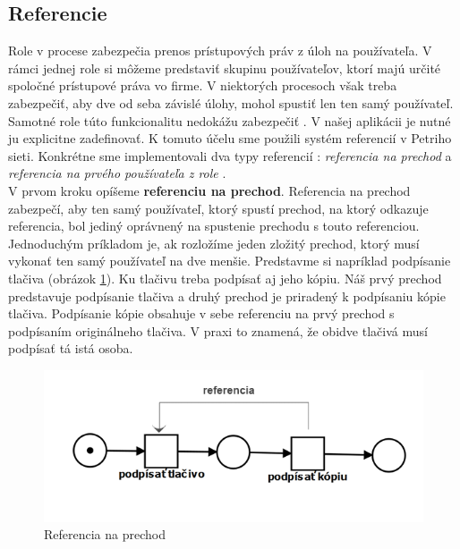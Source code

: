\subsection{Referencie}
Role v procese zabezpečia prenos prístupových práv z úloh na používateľa. V rámci jednej role si môžeme predstaviť skupinu používateľov, ktorí majú určité spoločné prístupové práva vo firme. V niektorých procesoch však treba zabezpečiť, aby dve od seba závislé úlohy, mohol spustiť len ten samý používateľ. Samotné role túto funkcionalitu nedokážu zabezpečiť . V našej aplikácii je nutné ju explicitne zadefinovať. K tomuto účelu sme použili systém referencií v Petriho sieti. Konkrétne sme implementovali dva typy referencií : \emph{referencia na prechod} a \emph{referencia na prvého používateľa z role} .\\ 

V prvom	 kroku opíšeme \textbf{referenciu na prechod}. Referencia na prechod zabezpečí, aby ten samý používateľ, ktorý spustí prechod, na ktorý odkazuje referencia, bol jediný oprávnený na spustenie prechodu s touto referenciou. Jednoduchým príkladom je, ak rozložíme jeden zložitý prechod, ktorý musí vykonať ten samý používateľ na dve menšie. Predstavme si napríklad podpísanie tlačiva (obrázok \ref{fig:referencia_na_prechod}). Ku tlačivu treba podpísať aj jeho kópiu. Náš prvý prechod predstavuje podpísanie tlačiva a druhý prechod je priradený k podpísaniu kópie tlačiva. Podpísanie kópie obsahuje v sebe referenciu na prvý prechod s podpísaním originálneho tlačiva. V praxi to znamená, že obidve tlačivá musí podpísať tá istá osoba. \\

	\begin{figure}[h]
		\centering
		\includegraphics[width=0.7\linewidth]{images/referencia}
		\caption{Referencia na prechod}
		\label{fig:referencia_na_prechod}
	\end{figure}


